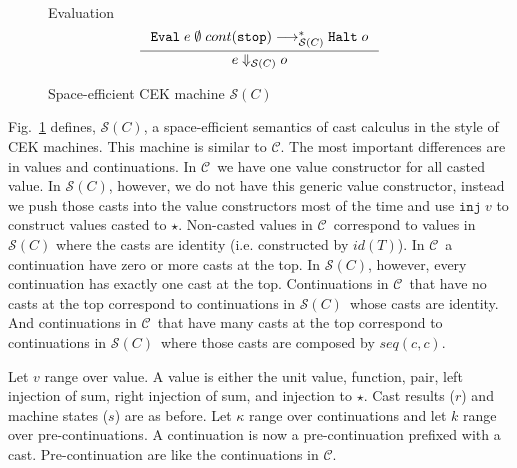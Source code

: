 \documentclass[acmsmall,review,anonymous]{acmart}\settopmatter{printfolios=true,printccs=false,printacmref=false}
\newcommand{\figref}[1]{Fig.~\ref{#1}}
\newcommand{\sOOinspect}[3]{\mathtt{Eval} \; #1 \; #2 \; #3}
\newcommand{\sOOhalt}[1]{\mathtt{Halt} \; #1}
\newcommand{\TOOdyn}[0]{\star}
\newcommand{\hcvOOinj}[2]{\mathtt{inj} \; #2}
\newcommand{\hckOOmt}[0]{\mathtt{stop}}
\newcommand{\judgeSreduceTrans}[3]{#2 \longrightarrow_{\mathcal{S}(#1)}^{*} #3}
\newcommand{\judgeSeval}[3]{#2 \Downarrow_{\mathcal{S}(#1)} #3}
\newcommand{\ineffCEK}{$ \mathcal{C} $}
\newcommand{\effCEK}[1]{$ \mathcal{S}(#1) $}
\begin{document}
\begin{figure}
\[\begin{array}{rclr}
{	}{}
	\end{array}
	\]
	
	
	Evaluation \fbox{$ \judgeSeval{C}{e}{o} $}
	\[
	\inference{
		\judgeSreduceTrans{C}{
			\sOOinspect{e}{\emptyset}{cont(\hckOOmt)}
		}{
			\sOOhalt{o}
		}		
	}{
		\judgeSeval{C}{e}{o}
	}
	\]
	
	\caption{Space-efficient CEK machine $ \mathcal{S}(C) $}
	\label{machine-cekcc}
\end{figure}
\figref{machine-cekcc} defines, \effCEK{C}, a space-efficient semantics of cast 
calculus in the style of CEK machines.
This machine is similar to \ineffCEK{}. 
The most important differences are in values and continuations.
In \ineffCEK\, we have one value constructor for all casted value.
In \effCEK{C}, however, we do not have this generic value constructor, 
instead we push those casts into the value constructors most of the time and 
use $ \hcvOOinj{P}{v} $ to construct values casted to $ \TOOdyn $.
Non-casted values in \ineffCEK\ correspond to values in \effCEK{C} where the 
casts are identity (i.e. constructed by $ id(T) $).
In \ineffCEK\, a continuation have zero or more casts at the top.
In \effCEK{C}, however, every continuation has exactly one cast at the top.
Continuations in \ineffCEK\ that have no casts at the top correspond to 
continuations in \effCEK{C}\ whose casts are identity.
And continuations in \ineffCEK\ that have many casts at the top correspond to 
continuations in \effCEK{C}\ where those casts are composed by $ 
seq(c,c) $.


Let $ v $ range over value. A value is either the unit value, function, pair, 
left injection of sum, right injection of sum, and injection to $ \TOOdyn $.
Cast results ($ r $) and machine states ($ s $) are as before. 
Let $ \kappa $ range over continuations and let $ k $ range over 
pre-continuations. 
A continuation is now a pre-continuation prefixed with a cast.
Pre-continuation are like the continuations in \ineffCEK.
\end{document}
